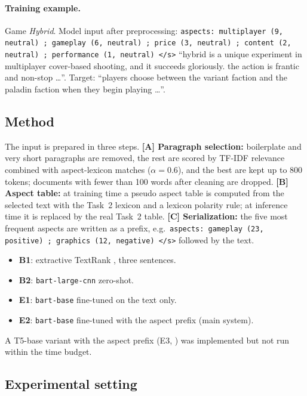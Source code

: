 \documentclass[11pt,a4paper]{article}
\begin{document}
\paragraph{Training example.} Game \emph{Hybrid}. Model input after preprocessing:
\texttt{aspects: multiplayer (9, neutral) ; gameplay (6, neutral) ; price (3, neutral) ;
content (2, neutral) ; performance (1, neutral) </s>} ``hybrid is a unique experiment in
multiplayer cover-based shooting, and it succeeds gloriously. the action is frantic and
non-stop \dots''. Target: ``players choose between the variant faction and the paladin faction
when they begin playing \dots''.

\subsection{Method}

The input is prepared in three steps.
\textbf{[A] Paragraph selection:} boilerplate and very short paragraphs are removed, the rest
are scored by TF-IDF relevance combined with aspect-lexicon matches ($\alpha=0.6$), and the
best are kept up to 800 tokens; documents with fewer than 100 words after cleaning are dropped.
\textbf{[B] Aspect table:} at training time a pseudo aspect table is computed from the selected
text with the Task~2 lexicon and a lexicon polarity rule; at inference time it is replaced by
the real Task~2 table. \textbf{[C] Serialization:} the five most frequent aspects are written as
a prefix, e.g.\ \texttt{aspects: gameplay (23, positive) ; graphics (12, negative) </s>}
followed by the text.

\begin{itemize}
  \item \textbf{B1}: extractive TextRank \citep{mihalcea2004textrank}, three sentences.
  \item \textbf{B2}: \texttt{bart-large-cnn} \citep{lewis2020bart} zero-shot.
  \item \textbf{E1}: \texttt{bart-base} fine-tuned on the text only.
  \item \textbf{E2}: \texttt{bart-base} fine-tuned with the aspect prefix (main system).
\end{itemize}
A T5-base variant with the aspect prefix (E3, \citealp{raffel2020t5}) was implemented but not
run within the time budget.

\subsection{Experimental setting}
\end{document}
